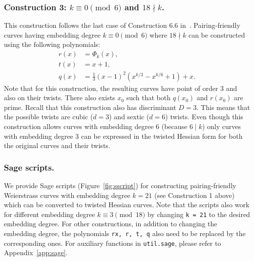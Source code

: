 

\subsubsection{Construction 3: $k \equiv 0 \pmod{6}$ and $18 \nmid k$.}
\label{con3}
This construction follows the last case of {Construction 6.6} in~\cite{2010/freeman}.
Pairing-friendly curves having embedding degree $k \equiv 0 \pmod{6}$ where $18 \nmid k$
can be constructed using the following polynomials:
\begin{align*}
r(x) &= \Phi_k(x),	\\
t(x) &= x+1,		\\
q(x) &= \frac{1}{3} (x-1)^2 (x^{k/3} - x^{k/6} + 1) + x.
\end{align*}
Note that for this construction,
the resulting curves have point of order 3 and also on their twists.
There also exists $x_0$ such that both $q(x_0)$ and $r(x_0)$ are prime.
Recall that this construction also has discriminant $D = 3$.
This means that the possible twists are  cubic ($d=3$) and sextic ($d=6$) twists.
Even though this construction allows curves with embedding degree $6$ (because $6 \mid k$)
only curves with embedding degree $3$ can be expressed in the twisted Hessian form
for both the original curves and their twists.



\subsubsection{Sage scripts.}
We provide Sage scripts (Figure~\ref{fig:sscript})
for constructing pairing-friendly Weierstrass curves with embedding degree $k = 21$
(see Construction 1 above)
which can be converted to twisted Hessian curves.
Note that the scripts also work for different embedding degree $k \equiv 3 \pmod{18}$ 
by changing \texttt{k = 21} to the desired embedding degree.
For other constructions,
in addition to changing the embedding degree,
the polynomials \texttt{rx, r, t, q} also need to be replaced by the corresponding ones.
For auxiliary functions in \texttt{util.sage}, please refer to Appendix~\ref{app:sage}.

